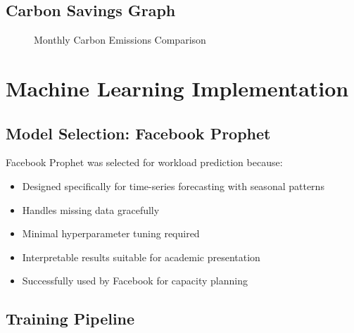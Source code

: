 \documentclass[12pt,a4paper]{report}
\begin{document}
\section{Carbon Savings Graph}

\begin{figure}[H]
\centering
{}
\caption{Monthly Carbon Emissions Comparison}
\end{figure}

\chapter{Machine Learning Implementation}

\section{Model Selection: Facebook Prophet}

Facebook Prophet was selected for workload prediction because:
\begin{itemize}
    \item Designed specifically for time-series forecasting with seasonal patterns
    \item Handles missing data gracefully
    \item Minimal hyperparameter tuning required
    \item Interpretable results suitable for academic presentation
    \item Successfully used by Facebook for capacity planning
\end{itemize}

\section{Training Pipeline}
\end{document}
